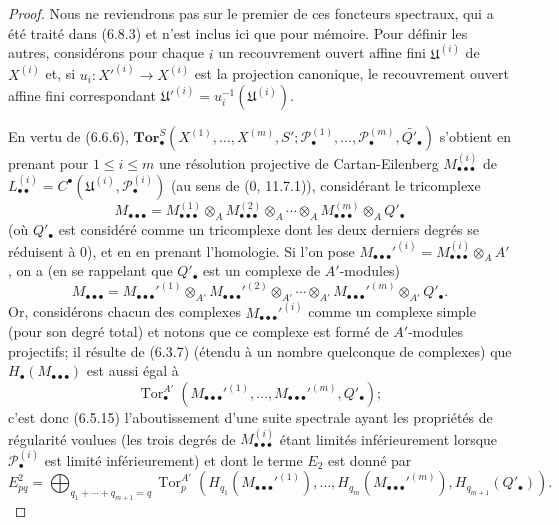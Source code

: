 \begin{proof}
Nous ne reviendrons pas sur le premier de ces foncteurs spectraux, qui a été
traité dans (6.8.3) et n'est inclus ici que pour mémoire. Pour définir les
autres, considérons pour chaque $i$ un recouvrement ouvert affine fini
$\mathfrak U^{(i)}$ de $X^{(i)}$ et, si
$u_i:X'^{(i)}\to X^{(i)}$ est la projection canonique, le recouvrement ouvert
affine fini correspondant
$\mathfrak U'^{(i)}=u_i^{-1}(\mathfrak U^{(i)})$.

En vertu de (6.6.6),
$\mathbf{Tor}_\bullet^S(X^{(1)},\ldots,X^{(m)},S';
\mathscr P_\bullet^{(1)},\ldots,\mathscr P_\bullet^{(m)},
\widetilde{Q'_\bullet})$ s'obtient en prenant pour $1\leq i\leq m$ une
résolution projective de Cartan-Eilenberg
$M_{\bullet\bullet\bullet}^{(i)}$ de
$L_{\bullet\bullet}^{(i)}=C^\bullet(\mathfrak U^{(i)},
\mathscr P_\bullet^{(i)})$ (au sens de (0, 11.7.1)), considérant le
tricomplexe
\[
  M_{\bullet\bullet\bullet}
  =M_{\bullet\bullet\bullet}^{(1)}\otimes_A
   M_{\bullet\bullet\bullet}^{(2)}\otimes_A\cdots\otimes_A
   M_{\bullet\bullet\bullet}^{(m)}\otimes_A Q'_\bullet
\]
(où $Q'_\bullet$ est considéré comme un tricomplexe dont les deux derniers
degrés se réduisent à $0$), et en en prenant l'homologie. Si l'on pose
$M_{\bullet\bullet\bullet}'^{(i)}=
M_{\bullet\bullet\bullet}^{(i)}\otimes_A A'$, on a (en se rappelant que
$Q'_\bullet$ est un complexe de $A'$-modules)
\[
  M_{\bullet\bullet\bullet}
  =M_{\bullet\bullet\bullet}'^{(1)}\otimes_{A'}
   M_{\bullet\bullet\bullet}'^{(2)}\otimes_{A'}\cdots\otimes_{A'}
   M_{\bullet\bullet\bullet}'^{(m)}\otimes_{A'} Q'_\bullet.
\]
Or, considérons chacun des complexes
$M_{\bullet\bullet\bullet}'^{(i)}$ comme un complexe simple (pour son degré
total) et notons que ce complexe est formé de $A'$-modules projectifs; il
résulte de (6.3.7) (étendu à un nombre quelconque de complexes) que
$H_\bullet(M_{\bullet\bullet\bullet})$ est aussi égal à
\[
  \operatorname{Tor}_\bullet^{A'}
  (M_{\bullet\bullet\bullet}'^{(1)},\ldots,
   M_{\bullet\bullet\bullet}'^{(m)},Q'_\bullet);
\]
c'est donc (6.5.15) l'aboutissement d'une suite spectrale ayant les propriétés
de régularité voulues (les trois degrés de
$M_{\bullet\bullet\bullet}^{(i)}$ étant limités inférieurement lorsque
$\mathscr P_\bullet^{(i)}$ est limité inférieurement) et dont le terme $E_2$
est donné par
\[
  E_{pq}^2
  =\bigoplus_{q_1+\cdots+q_{m+1}=q}
  \operatorname{Tor}_p^{A'}
  (H_{q_1}(M_{\bullet\bullet\bullet}'^{(1)}),\ldots,
   H_{q_m}(M_{\bullet\bullet\bullet}'^{(m)}),H_{q_{m+1}}(Q'_\bullet)).
\]


\end{proof}
